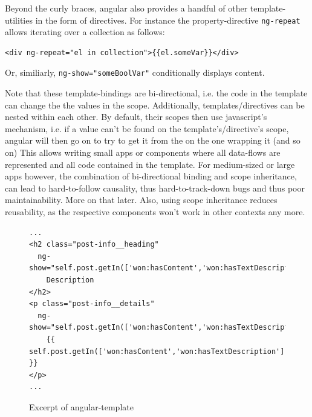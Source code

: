 Beyond the curly braces, angular also provides a handful of other template-utilities in the form of directives. For instance the property-directive \texttt{ng-repeat} allows iterating over a collection as follows:

\begin{verbatim}
<div ng-repeat="el in collection">{{el.someVar}}</div>
\end{verbatim} 

Or, similiarly, \texttt{ng-show="someBoolVar"} conditionally displays content.

Note that these template-bindings are bi-directional, i.e. the code in the template can change the the values in the scope. Additionally, templates/directives can be nested within each other. By default, their scopes then use javascript's  mechanism, i.e. if a value can't be found on the template's/directive's scope, angular will then go on to try to get it from the on the one wrapping it (and so on)
This allows writing small apps or components where all data-flows are represented and all code contained in the template. For medium-sized or large apps however, the combination of bi-directional binding and scope inheritance, can lead to hard-to-follow causality, thus hard-to-track-down bugs and thus poor maintainability. More on that later. %
Also, using scope inheritance reduces reusability, as the respective components won't work in other contexts any more. 

\begin{figure}
\centering
\begin{verbatim}
...
<h2 class="post-info__heading"
  ng-show="self.post.getIn(['won:hasContent','won:hasTextDescription'])">
    Description
</h2>
<p class="post-info__details"
  ng-show="self.post.getIn(['won:hasContent','won:hasTextDescription'])">
    {{ self.post.getIn(['won:hasContent','won:hasTextDescription']) }}
</p>
...
\end{verbatim}
\caption{Excerpt of angular-template}
\label{fig:ng-template}
\end{figure}


